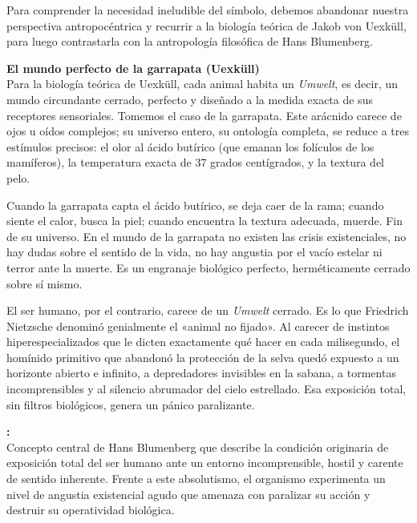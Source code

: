Para comprender la necesidad ineludible del símbolo, debemos abandonar nuestra perspectiva antropocéntrica y recurrir a la biología teórica de Jakob von Uexküll, para luego contrastarla con la antropología filosófica de Hans Blumenberg.

\begin{ejemplo}
\textbf{El mundo perfecto de la garrapata (Uexküll)}\\
Para la biología teórica de Uexküll, cada animal habita un \textit{Umwelt}, es decir, un mundo circundante cerrado, perfecto y diseñado a la medida exacta de sus receptores sensoriales. Tomemos el caso de la garrapata. Este arácnido carece de ojos u oídos complejos; su universo entero, su ontología completa, se reduce a tres estímulos precisos: el olor al ácido butírico (que emanan los folículos de los mamíferos), la temperatura exacta de 37 grados centígrados, y la textura del pelo. 

Cuando la garrapata capta el ácido butírico, se deja caer de la rama; cuando siente el calor, busca la piel; cuando encuentra la textura adecuada, muerde. Fin de su universo. En el mundo de la garrapata no existen las crisis existenciales, no hay dudas sobre el sentido de la vida, no hay angustia por el vacío estelar ni terror ante la muerte. Es un engranaje biológico perfecto, herméticamente cerrado sobre sí mismo.
\end{ejemplo}

El ser humano, por el contrario, carece de un \textit{Umwelt} cerrado. Es lo que Friedrich Nietzsche denominó genialmente el «animal no fijado». Al carecer de instintos hiperespecializados que le dicten exactamente qué hacer en cada milisegundo, el homínido primitivo que abandonó la protección de la selva quedó expuesto a un horizonte abierto e infinito, a depredadores invisibles en la sabana, a tormentas incomprensibles y al silencio abrumador del cielo estrellado. Esa exposición total, sin filtros biológicos, genera un pánico paralizante.

\begin{definicion}
\textbf{\AbsolutismoRealidad:}\\
Concepto central de Hans Blumenberg que describe la condición originaria de exposición total del ser humano ante un entorno incomprensible, hostil y carente de sentido inherente. Frente a este absolutismo, el organismo experimenta un nivel de angustia existencial agudo que amenaza con paralizar su acción y destruir su operatividad biológica.
\end{definicion}


